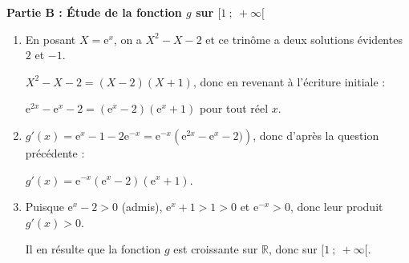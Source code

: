 \documentclass[10pt]{article}
\providecommand{\R}{\mathbb{R}}
\providecommand{\e}{{\mathrm{e}}}
\begin{document}
\textbf{Partie B : Étude de la fonction $g$ sur $[1~;~+\infty[$}

\medskip

\begin{enumerate}
\item 


En posant $X = \e^x$, on a $X^2 - X - 2$ et ce trinôme a deux solutions évidentes $2$ et $- 1$.

$X^2 - X - 2 = (X - 2)(X + 1)$, donc en revenant à l'écriture initiale :

$\e^{2x} - \e^x - 2 = \left(\e^x - 2\right)\left(\e^x + 1\right)$ pour tout réel $x$.
\item 
$g'(x) = \e^x - 1 - 2\e^{-x} = \e^{-x}\left(\e^{2x} - \e^{x} - 2)\right)$, donc d'après la question précédente :

$g'(x) = \e^{-x}\left(\e^x - 2\right)\left(\e^x + 1\right).$
\item 
Puisque $\e^x - 2 > 0$ (admis), $\e^x + 1 > 1 > 0$  et $\e^{-x} > 0$, donc leur produit $g'(x) > 0$.

Il en résulte que la fonction $g$ est croissante sur $\R$, donc sur $[1~;~ +\infty[$.

\end{enumerate}
\end{document}
